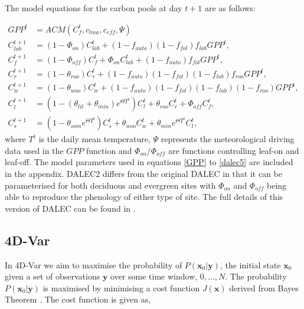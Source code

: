 \documentclass[11pt]{article}
\begin{document}
The model equations for the carbon pools at day $t+1$ are as follows:

\begin{align}
GPP^{t} &= ACM(C_f^{t}, c_{lma}, c_{eff}, \Psi) \label{GPP}
\\C_{lab}^{t+1}&=(1-\Phi _{on})C_{lab}^{t}+(1-f_{auto})(1-f_{fol})f_{lab}GPP^{t}, \label{daleclab}
\\C_f^{t+1}&=(1-\Phi_{off})C_f^{t}+\Phi_{on}C_{lab}^{t}+(1-f_{auto})f_{fol}GPP^{t}, \label{dalec1}
\\C_r^{t+1}&=(1-\theta_{roo})C_r^{t}+(1-f_{auto})(1-f_{fol})(1-f_{lab})f_{roo}GPP^{t}, 
\\C_w^{t+1}&=(1-\theta_{woo})C_w^{t}+(1-f_{auto})(1-f_{fol})(1-f_{lab})(1-f_{roo})GPP^{t}, 
\\C_l^{t+1}&=(1-(\theta_{lit}+\theta_{min})e^{\Theta T^{t}})C_l^{t}+\theta_{roo}C_r^{t}+\Phi_{off}C_f^{t}, 
\\C_s^{t+1}&=(1-\theta_{som}e^{\Theta T^{t}})C_s^{t}+\theta_{woo}C_w^{t}+\theta_{min}e^{\Theta T^{t}}C_l^{t}, \label{dalec5}
\end{align}
where $T^{t}$ is the daily mean temperature, $\Psi$ represents the meteorological driving data used in the $GPP$ function and $\Phi_{on} / \Phi_{off}$ are functions controlling leaf-on and leaf-off. The model parameters used in equations \ref{GPP} to \ref{dalec5} are included in the appendix. DALEC2 differs from the original DALEC in that it can be parameterised for both deciduous and evergreen sites with $\Phi_{on}$ and $\Phi_{off}$ being able to reproduce the phenology of either type of site. The full details of this version of DALEC can be found in \cite{Bloom2015}. 

\subsection{4D-Var} \label{4dvar}

In 4D-Var we aim to maximise the probability of $P(\textbf{x}_0|\textbf{y})$, the initial state $\textbf{x}_0$ given a set of observations $\textbf{y}$ over some time window, $0, \dots, N$. The probability $P(\textbf{x}_0|\textbf{y})$ is maximised by minimising a cost function $J(\textbf{x})$ derived from Bayes Theorem \citep{lawless2013}. The cost function is given as,
\end{document}

